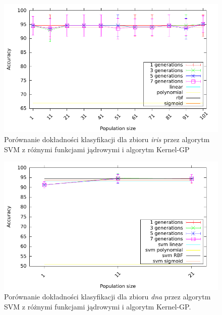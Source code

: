 \documentclass{article}
\begin{document}
	\begin{figure}[ht]
		\includegraphics[scale=0.90]{figures/accuracy-iris-svm}
		\caption{Porównanie dokładności klasyfikacji dla zbioru \emph{iris} przez algorytm SVM z różnymi funkcjami jądrowymi i algorytm Kernel-GP\label{fig:acc-iris-svm}}
	\end{figure}
	
		\begin{figure}[ht]
		\includegraphics[scale=0.90]{figures/accuracy-dna-svm}
		\caption{Porównanie dokładności klasyfikacji dla zbioru \emph{dna} przez algorytm SVM z różnymi funkcjami jądrowymi i algorytm Kernel-GP.\label{fig:acc-dna-svm}}
	\end{figure}	
	
\end{document}
